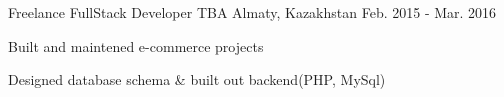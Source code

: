 \begin{cventries}
  \cventry
    {Freelance FullStack Developer} %
    {TBA} %
    {Almaty, Kazakhstan} %
    {Feb. 2015 - Mar. 2016} %
    {
      \begin{cvitems} %
        \item {Built and maintened e-commerce projects}
        \item {Designed database schema & built out backend(PHP, MySql)}
      \end{cvitems}
    }

\end{cventries}
